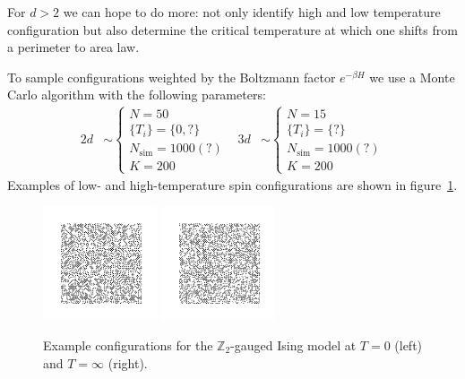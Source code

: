 \documentclass[11pt]{article}
\begin{document}
For $d>2$ we can hope to do more: not only identify high and low temperature configuration but also determine the critical temperature at which one shifts from a perimeter to area law.

To sample configurations weighted by the Boltzmann factor $e^{-\beta H}$ we use a Monte Carlo algorithm with the following parameters:
\begin{align}
    2d&\sim\left\{\begin{array}{l}
        N = 50\\
        \{T_i\} = \{0,?\}\\
        N_\text{sim} = 1000(?)\\
        K = 200
    \end{array}\right. & 3d&\sim\left\{\begin{array}{l}
        N = 15\\
        \{T_i\} = \{?\}\\
        N_\text{sim} = 1000(?)\\
        K = 200
    \end{array}\right.
\end{align}
Examples of low- and high-temperature spin configurations are shown in figure~\ref{fig:GaugedExampleConfigs}.

\begin{figure}[h]
    \centering
    \includegraphics[width=0.3\textwidth]{gauged_images/gauged_T=0.png}
    \includegraphics[width=0.3\textwidth]{gauged_images/gauged_T=inf.png}
    \caption{Example configurations for the $\mathbb{Z}_2$-gauged Ising model at $T=0$ (left) and $T=\infty$ (right).}
    \label{fig:GaugedExampleConfigs}
\end{figure}
\end{document}
